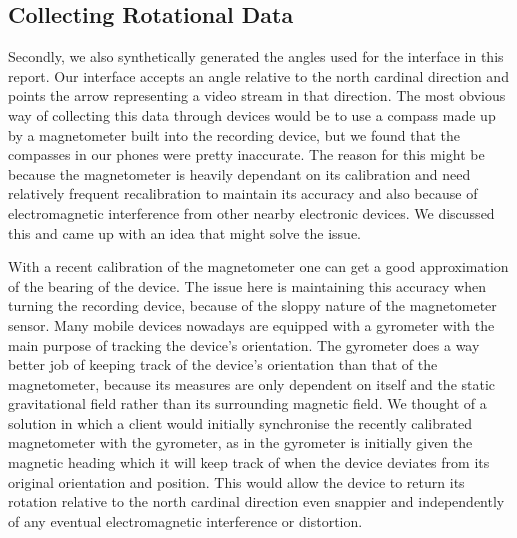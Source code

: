\subsection{Collecting Rotational Data}
\label{sec:collectingrotationaldata}
Secondly, we also synthetically generated the angles used for the interface in this report. Our interface accepts an angle relative to the north cardinal direction and points the arrow representing a video stream in that direction. The most obvious way of collecting this data through devices would be to use a compass made up by a magnetometer built into the recording device, but we found that the compasses in our phones were pretty inaccurate. The reason for this might be because the magnetometer is heavily dependant on its calibration and need relatively frequent recalibration to maintain its accuracy and also because of electromagnetic interference from other nearby electronic devices. We discussed this and came up with an idea that might solve the issue.

With a recent calibration of the magnetometer one can get a good approximation of the bearing of the device. The issue here is maintaining this accuracy when turning the recording device, because of the sloppy nature of the magnetometer sensor. Many mobile devices nowadays are equipped with a gyrometer with the main purpose of tracking the device’s orientation. The gyrometer does a way better job of keeping track of the device’s orientation than that of the magnetometer, because its measures are only dependent on itself and the static gravitational field rather than its surrounding magnetic field. We thought of a solution in which a client would initially synchronise the recently calibrated magnetometer with the gyrometer, as in the gyrometer is initially given the magnetic heading which it will keep track of when the device deviates from its original orientation and position. This would allow the device to return its rotation relative to the north cardinal direction even snappier and independently of any eventual electromagnetic interference or distortion. 

